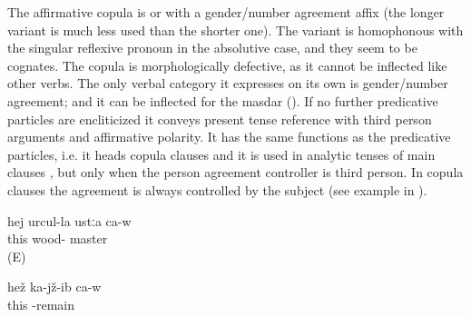 The affirmative copula is  or  with a gender/number agreement affix (the longer variant is much less used than the shorter one). The variant  is homophonous with the singular reflexive pronoun in the absolutive case, and they seem to be cognates. The copula is morphologically defective, as it cannot be inflected like other verbs. The only verbal category it expresses on its own is gender/number agreement; and it can be inflected for the masdar (). If no further predicative particles are encliticized it conveys present tense reference with third person arguments and affirmative polarity. It has the same functions as the predicative particles, i.e. it heads copula clauses  and it is used in analytic tenses of main clauses , but only when the person agreement controller is third person. In copula clauses the agreement is always controlled by the subject (see example  in ).
%
\begin{exe}
	\ex	\label{ex:He is a carpenter}
	\gll	hej	urcul-la	ustːa	ca-w\\
		this	wood-	master	\\
	\glt	{} (E)

	\ex	\label{ex:He is sitting}
	\gll	hež	ka-jž-ib	ca-w\\
		this	-remain	\\
	\glt	{}
\end{exe}

